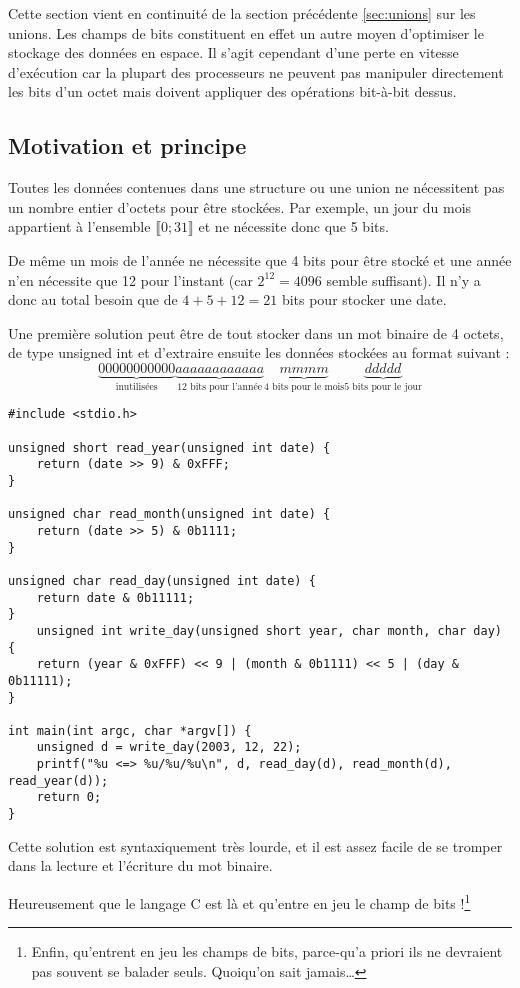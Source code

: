 \documentclass[../../../main.tex]{subfiles}
\begin{document}
Cette section vient en continuité de la section précédente \ref{sec:unions} sur les unions. Les champs de bits constituent
en effet un autre moyen d'optimiser le stockage des données en espace. Il s'agit cependant d'une perte
en vitesse d'exécution car la plupart des processeurs ne peuvent pas manipuler directement les bits
d'un octet mais doivent appliquer des opérations bit-à-bit dessus.
\subsection{Motivation et principe}
\label{sub:motivation_et_principe}
Toutes les données contenues dans une structure ou une union ne nécessitent pas un nombre entier
d'octets pour être stockées. Par exemple, un jour du mois appartient à l'ensemble $\llbracket 0; 31\rrbracket$ et ne nécessite
donc que 5 bits.

De même un mois de l'année ne nécessite que 4 bits pour être stocké et une année n'en nécessite que
12 pour l'instant (car $2^{12} = 4096$ semble suffisant). Il n'y a donc au total besoin que de $4 + 5 + 12 = 21$ bits pour stocker une date.

Une première solution peut être de tout stocker dans un mot binaire de 4 octets, de type unsigned int
et d'extraire ensuite les données stockées au format suivant :
$$\underbrace{00000000000}_{\text{inutilisées}}\underbrace{aaaaaaaaaaaa}_{\text{12 bits pour l'année}}\underbrace{mmmm}_{\text{4 bits pour le mois}}\underbrace{ddddd}_{\text{5 bits pour le jour}}$$
\begin{verbatim}
#include <stdio.h>

unsigned short read_year(unsigned int date) {
	return (date >> 9) & 0xFFF;
}

unsigned char read_month(unsigned int date) {
	return (date >> 5) & 0b1111;
}

unsigned char read_day(unsigned int date) {
	return date & 0b11111;
}
	unsigned int write_day(unsigned short year, char month, char day) {
	return (year & 0xFFF) << 9 | (month & 0b1111) << 5 | (day & 0b11111);
}

int main(int argc, char *argv[]) {
	unsigned d = write_day(2003, 12, 22);
	printf("%u <=> %u/%u/%u\n", d, read_day(d), read_month(d), read_year(d));
	return 0;
}
\end{verbatim}
Cette solution est syntaxiquement très lourde, et il est assez facile de se tromper dans la lecture et
l'écriture du mot binaire.

Heureusement que le langage C est là et qu'entre en jeu le champ de bits !\footnote{Enfin, qu'entrent en jeu les champs de bits, parce-qu'a priori ils ne devraient pas souvent se balader seuls. Quoiqu'on sait jamais\dots}
\end{document}
